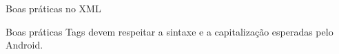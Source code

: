 \documentclass[aspectratio=169]{beamer}
\begin{document}
\begin{frame}{Boas práticas no XML}

\vspace{0.15cm}

\begin{block}{Boas práticas}
\centering
Tags devem respeitar a sintaxe e a capitalização esperadas pelo Android.
\end{block}

\end{frame}
\end{document}
